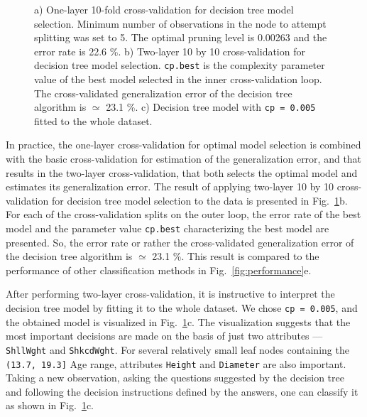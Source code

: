 \documentclass[10pt, paper=a4]{article}
\begin{document}
\begin{figure}[h!]
\begin{minipage}{0.99\textwidth}
\begin{center}
    \end{center}
  \end{minipage} \vfill
  \cprotect\caption{a) One-layer 10-fold cross-validation for decision
    tree model selection.  Minimum number of observations in the node
    to attempt splitting was set to 5.  The optimal pruning level is
    0.00263 and the error rate is 22.6 \%.  b) Two-layer 10 by 10
    cross-validation for decision tree model selection.
    \verb|cp.best| is the complexity parameter value of the best model
    selected in the inner cross-validation loop.  The cross-validated
    generalization error of the decision tree algorithm is $\simeq$
    23.1 \%.  c) Decision tree model with \verb|cp = 0.005| fitted to
    the whole dataset.}
  \label{fig:decision_trees}
\end{figure}

In practice, the one-layer cross-validation for optimal model
selection is combined with the basic cross-validation for estimation
of the generalization error, and that results in the two-layer
cross-validation, that both selects the optimal model and estimates
its generalization error.  The result of applying two-layer 10 by 10
cross-validation for decision tree model selection to the data is
presented in Fig.~\ref{fig:decision_trees}b.  For each of the
cross-validation splits on the outer loop, the error rate of the best
model and the parameter value \verb|cp.best| characterizing the best
model are presented.  So, the error rate or rather the cross-validated
generalization error of the decision tree algorithm is $\simeq$ 23.1
\%.  This result is compared to the performance of other
classification methods in Fig.~\ref{fig:performance}e.

After performing two-layer cross-validation, it is instructive to
interpret the decision tree model by fitting it to the whole dataset.
We chose \verb|cp = 0.005|, and the obtained model is visualized in
Fig.~\ref{fig:decision_trees}c.  The visualization suggests that the
most important decisions are made on the basis of just two attributes
--- \verb|ShllWght| and \verb|ShkcdWght|.  For several relatively
small leaf nodes containing the \verb|(13.7, 19.3]| Age range,
attributes \verb|Height| and \verb|Diameter| are also important.
Taking a new observation, asking the questions suggested by the
decision tree and following the decision instructions defined by the
answers, one can classify it as shown in
Fig.~\ref{fig:decision_trees}c.
\end{document}
